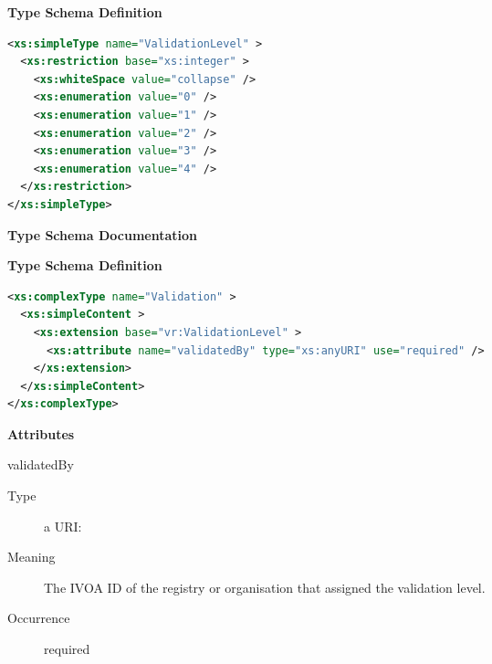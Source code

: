 \documentclass[11pt,a4paper]{ivoa}
\begin{document}
\begin{generated}
\begin{longtermsdescription}
\end{longtermsdescription}
\vspace{1ex}\noindent\textbf{ Type Schema Definition}

\begin{lstlisting}[language=XML,basicstyle=\footnotesize]
<xs:simpleType name="ValidationLevel" >
  <xs:restriction base="xs:integer" >
    <xs:whiteSpace value="collapse" />
    <xs:enumeration value="0" />
    <xs:enumeration value="1" />
    <xs:enumeration value="2" />
    <xs:enumeration value="3" />
    <xs:enumeration value="4" />
  </xs:restriction>
</xs:simpleType>
\end{lstlisting}\endgroup
\end{generated}


\begin{generated}
\begingroup
      	\renewcommand*\descriptionlabel[1]{%
      	\hbox to 5.5em{\emph{#1}\hfil}}\vspace{2ex}\noindent\textbf{ Type Schema Documentation}


\vspace{1ex}\noindent\textbf{ Type Schema Definition}

\begin{lstlisting}[language=XML,basicstyle=\footnotesize]
<xs:complexType name="Validation" >
  <xs:simpleContent >
    <xs:extension base="vr:ValidationLevel" >
      <xs:attribute name="validatedBy" type="xs:anyURI" use="required" />
    </xs:extension>
  </xs:simpleContent>
</xs:complexType>
\end{lstlisting}

\vspace{0.5ex}\noindent\textbf{ Attributes}

\begingroup\small\begin{bigdescription}
\item[validatedBy]
\begin{description}
\item[Type] a URI: 
\item[Meaning] 
               The IVOA ID of the registry or organisation that
               assigned the validation level.  
             
\item[Occurrence] required
\end{description}


\end{bigdescription}\endgroup

\endgroup
\end{generated}
\end{document}
